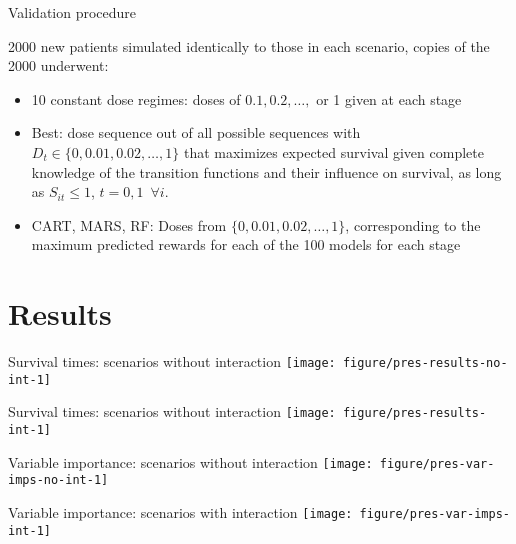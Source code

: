 \documentclass[handout]{beamer}
\begin{document}
\begin{frame}[t]{Validation procedure}
  
  2000 new patients simulated identically to those in each scenario, copies of the 2000 underwent:
  \begin{itemize}[<+(1)->]
    \item 10 constant dose regimes: doses of $0.1, 0.2, \ldots,$ or 1 given at each stage
    \item Best: dose sequence out of all possible sequences with $D_{t} \in \{0, 0.01, 0.02, \ldots, 1\}$ that maximizes expected survival given complete knowledge of the transition functions and their influence on survival, as long as $S_{it} \leq 1$, $t = 0, 1 \enspace \forall i$.
    \item CART, MARS, RF: Doses from $\{0, 0.01, 0.02, \ldots, 1\}$, corresponding to the maximum predicted rewards for each of the 100 models for each stage
  \end{itemize}
\end{frame}

\section{Results} %
\label{sec:results}


\begin{frame}[c]{Survival times: scenarios without interaction}
\centering
  \texttt{[image: figure/pres-results-no-int-1]} 
\end{frame}

\begin{frame}[c]{Survival times: scenarios without interaction}
  \centering
  \texttt{[image: figure/pres-results-int-1]} 
\end{frame}

\begin{frame}[c]{Variable importance: scenarios without interaction}
\centering
  \texttt{[image: figure/pres-var-imps-no-int-1]} 
\end{frame}

\begin{frame}[c]{Variable importance: scenarios with interaction}
  \centering
  \texttt{[image: figure/pres-var-imps-int-1]} 
\end{frame}
\end{document}
